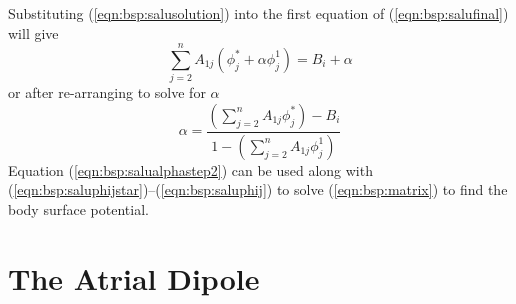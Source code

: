 Substituting (\ref{eqn:bsp:salusolution}) into the first equation of
(\ref{eqn:bsp:salufinal}) will give
\begin{equation}
\label{eqn:bsp:salualphastep1}
\sum_{j=2}^n A_{1j} \left(\phi_j^* + \alpha\phi_j^1\right) = B_i + \alpha
\end{equation}
or after re-arranging to solve for $\alpha$
\begin{equation}
\label{eqn:bsp:salualphastep2}
\alpha = 
    \frac{
        \left(\sum_{j=2}^n A_{1j} \phi_j^*\right)-B_i
        }{
        1-\left(\sum_{j=2}^n A_{1j} \phi_j^1\right)
        }
\end{equation}
Equation (\ref{eqn:bsp:salualphastep2}) can be used along with
(\ref{eqn:bsp:saluphijstar})--(\ref{eqn:bsp:saluphij}) to solve
(\ref{eqn:bsp:matrix}) to find the body surface potential.

\section{The Atrial Dipole}

